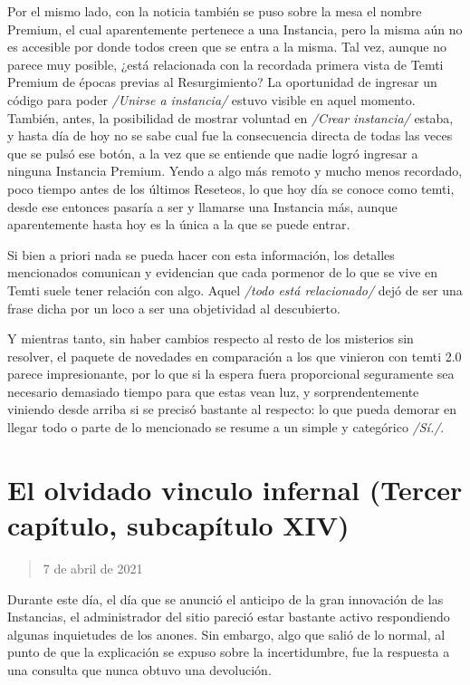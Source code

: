 \documentclass[
  spanish,
]{book}
\begin{document}
Por el mismo lado, con la noticia también se puso sobre la mesa el nombre Premium, el cual aparentemente pertenece a una Instancia, pero la misma aún no es accesible por donde todos creen que se entra a la misma. Tal vez, aunque no parece muy posible, ¿está relacionada con la recordada primera vista de Temti Premium de épocas previas al Resurgimiento? La oportunidad de ingresar un código para poder \emph{/Unirse a instancia/} estuvo visible en aquel momento. También, antes, la posibilidad de mostrar voluntad en \emph{/Crear instancia/} estaba, y hasta día de hoy no se sabe cual fue la consecuencia directa de todas las veces que se pulsó ese botón, a la vez que se entiende que nadie logró ingresar a ninguna Instancia Premium. Yendo a algo más remoto y mucho menos recordado, poco tiempo antes de los últimos Reseteos, lo que hoy día se conoce como temti, desde ese entonces pasaría a ser y llamarse una Instancia más, aunque aparentemente hasta hoy es la única a la que se puede entrar.

Si bien a priori nada se pueda hacer con esta información, los detalles mencionados comunican y evidencian que cada pormenor de lo que se vive en Temti suele tener relación con algo. Aquel \emph{/todo está relacionado/} dejó de ser una frase dicha por un loco a ser una objetividad al descubierto.

Y mientras tanto, sin haber cambios respecto al resto de los misterios sin resolver, el paquete de novedades en comparación a los que vinieron con temti 2.0 parece impresionante, por lo que si la espera fuera proporcional seguramente sea necesario demasiado tiempo para que estas vean luz, y sorprendentemente viniendo desde arriba si se precisó bastante al respecto: lo que pueda demorar en llegar todo o parte de lo mencionado se resume a un simple y categórico \emph{/Sí./}.

\hypertarget{el-olvidado-vinculo-infernal-tercer-capuxedtulo-subcapuxedtulo-xiv}{%
\section{El olvidado vinculo infernal (Tercer capítulo, subcapítulo XIV)}\label{el-olvidado-vinculo-infernal-tercer-capuxedtulo-subcapuxedtulo-xiv}}

\begin{quote}
7 de abril de 2021
\end{quote}

Durante este día, el día que se anunció el anticipo de la gran innovación de las Instancias, el administrador del sitio pareció estar bastante activo respondiendo algunas inquietudes de los anones. Sin embargo, algo que salió de lo normal, al punto de que la explicación se expuso sobre la incertidumbre, fue la respuesta a una consulta que nunca obtuvo una devolución.
\end{document}
